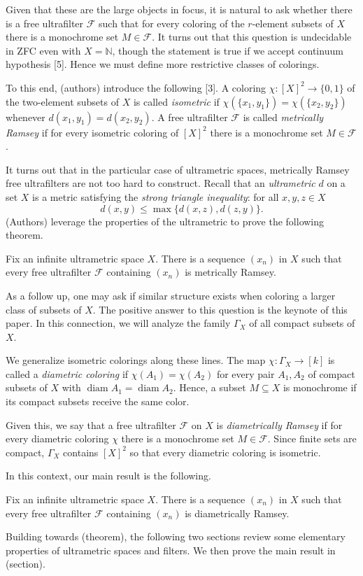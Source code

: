 Given that these are the large objects in focus, it is natural to ask whether there is a free ultrafilter \( \mathcal{F}  \) such that for every coloring of the \( r \)-element subsets of \( X \) there is a monochrome set \( M \in \mathcal{F}  \). It turns out that this question is undecidable in ZFC even with \( X = \mathbb{N}  \), though the statement is true if we accept continuum hypothesis [5]. Hence we must define more restrictive classes of colorings.

To this end, (authors) introduce the following [3]. A coloring \( \chi : [X]^{2} \to \{ 0 , 1 \}  \) of the two-element subsets of \( X \) is called \emph{isometric} if \( \chi (\{ x_1, y_1 \} ) = \chi (\{ x_2, y_2 \} ) \) whenever \( d(x_1, y_1) = d(x_2, y_2) \). A free ultrafilter \( \mathcal{F}  \) is called \emph{metrically Ramsey} if for every isometric coloring of \( [X]^{2}  \) there is a monochrome set \( M \in \mathcal{F}  \).

It turns out that in the particular case of ultrametric spaces, metrically Ramsey free ultrafilters are not too hard to construct. Recall that an \emph{ultrametric} \( d \) on a set \( X \) is a metric satisfying the \emph{strong triangle inequality}: for all \( x,y,z \in X \) \[ d(x,y) \leq \max \{ d(x,z), d(z,y) \}.  \] (Authors) leverage the properties of the ultrametric to prove the following theorem.

\begin{theorem}
Fix an infinite ultrametric space \( X \). There is a sequence \( (x_{n}) \) in \( X \) such that every free ultrafilter \( \mathcal{F}  \) containing \( (x_{n}) \) is metrically Ramsey.
\end{theorem}

As a follow up, one may ask if similar structure exists when coloring a larger class of subsets of \( X \). The positive answer to this question is the keynote of this paper. In this connection, we will analyze the family \( \Gamma_{X}  \) of all compact subsets of \( X \).

We generalize isometric colorings along these lines. The map \( \chi : \Gamma_{X}  \to [k] \) is called a \emph{diametric coloring} if \( \chi (A_1) = \chi (A_2) \) for every pair \( A_1, A_2 \) of compact subsets of \( X \) with \( \operatorname{diam} A_1 = \operatorname{diam} A_2  \). Hence, a subset \( M \subseteq X \) is monochrome if its compact subsets receive the same color. 

Given this, we say that a free ultrafilter \( \mathcal{F}  \) on \( X \) is \emph{diametrically Ramsey} if for every diametric coloring \( \chi \) there is a monochrome set \( M  \in \mathcal{F}  \). Since finite sets are compact, \( \Gamma_{X}  \) contains \( [X]^{2}  \) so that every diametric coloring is isometric.

In this context, our main result is the following.
\begin{theorem}
Fix an infinite ultrametric space \( X \). There is a sequence \( (x_{n}) \) in \( X \) such that every free ultrafilter \( \mathcal{F}  \) containing \( (x_{n}) \) is diametrically Ramsey.
\end{theorem}
Building towards (theorem), the following two sections review some elementary properties of ultrametric spaces and filters. We then prove the main result in (section).
